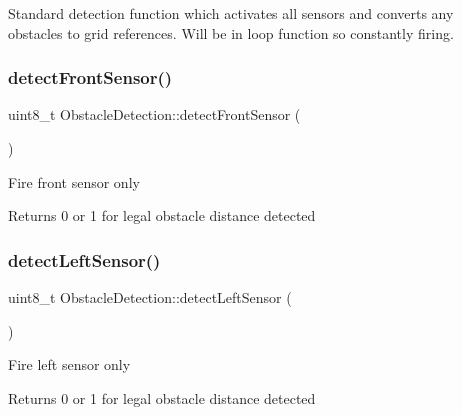 Standard detection function which activates all sensors and converts any obstacles to grid references. Will be in loop function so constantly firing. \mbox{\label{class_obstacle_detection_aa7974520bcbaa2d10254fb498347b8c3}} 
\subsubsection{\texorpdfstring{detect\+Front\+Sensor()}{detectFrontSensor()}}
{\footnotesize\ttfamily uint8\+\_\+t Obstacle\+Detection\+::detect\+Front\+Sensor (\begin{DoxyParamCaption}{ }\end{DoxyParamCaption})\hspace{0.3cm}{\ttfamily [private]}}

Fire front sensor only \begin{DoxyReturn}{Returns}
0 or 1 for legal obstacle distance detected 
\end{DoxyReturn}
\mbox{\label{class_obstacle_detection_adbb2c4295e35c5c4c2b63aed42588bd0}} 
\subsubsection{\texorpdfstring{detect\+Left\+Sensor()}{detectLeftSensor()}}
{\footnotesize\ttfamily uint8\+\_\+t Obstacle\+Detection\+::detect\+Left\+Sensor (\begin{DoxyParamCaption}{ }\end{DoxyParamCaption})\hspace{0.3cm}{\ttfamily [private]}}

Fire left sensor only \begin{DoxyReturn}{Returns}
0 or 1 for legal obstacle distance detected 
\end{DoxyReturn}
\mbox{\label{class_obstacle_detection_a135adf6077c8af44e33e6814ad7ee9f0}} 
